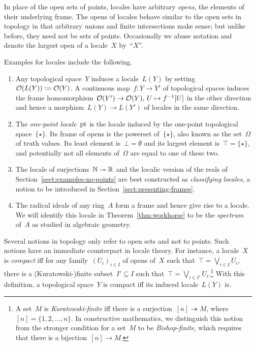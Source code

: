 \documentclass{ws-rv9x6}
\begin{document}
{In place of the open sets of points, locales have arbitrary \emph{opens}, the
elements of their underlying frame. The opens of locales behave similar to the
open sets in topology in that arbitrary unions and finite intersections make
sense; but unlike before, they need not be sets of points. Occasionally we
abuse notation and denote the largest open of a locale~$X$ by~``$X$''.

Examples for locales include the following.
\begin{enumerate}
\item Any topological space~$Y$ induces a locale~$L(Y)$ by
setting~$\mathcal{O}(L(Y)) \vcentcolon= \mathcal{O}(Y)$. A continuous map~$f : Y \to Y'$ of topological
spaces induces the frame homomorphism~$\mathcal{O}(Y') \to \mathcal{O}(Y),\,U \mapsto f^{-1}[U]$
in the other direction and hence a morphism~$L(Y) \to L(Y')$ of locales in the
same direction.
\item The \emph{one-point locale}~$\mathrm{pt}$ is the locale induced
by the one-point topological space~$\{\star\}$. Its frame of opens is
the powerset of~$\{\star\}$, also known as the set~$\Omega$ of truth
values. Its least element is~$\bot = \emptyset$ and its largest element
is~$\top = \{\star\}$, and potentially not all elements of~$\Omega$ are equal
to one of these two.
\item The locale of surjections~$\mathbb{N} \twoheadrightarrow \mathbb{R}$ and the localic
version of the reals of Section~\ref{sect:examples-no-points} are best
constructed as \emph{classifying locales}, a notion to be introduced in
Section~\ref{sect:presenting-frames}.
\item The radical ideals of any ring~$A$ form a frame and hence give rise to a
locale. We will identify this locale in Theorem~\ref{thm:workhorse} to be the
\emph{spectrum} of~$A$ as studied in algebraic geometry.
\end{enumerate}

Several notions in topology only refer to open sets and not to points. Such
notions have an immediate counterpart in locale theory. For instance, a
locale~$X$ is \emph{compact} iff for any family~$(U_i)_{i \in I}$ of opens
of~$X$ such that~$\top = \bigvee_{i \in I} U_i$, there is a (Kuratowski-)finite
subset~$I' \subseteq I$ such that~$\top = \bigvee_{i \in I'} U_i$.\footnote{A
set~$M$ is \emph{Kuratowski-finite} iff there is a surjection~$[n]
\twoheadrightarrow M$, where~$[n] = \{1,2,\ldots,n\}$. In constructive
mathematics, we distinguish this notion from the stronger condition for a
set~$M$ to be \emph{Bishop-finite}, which requires that there is a
bijection~$[n] \to M$.}
With this definition, a topological space~$Y$ is compact iff its induced locale~$L(Y)$ is.

}
\end{document}
